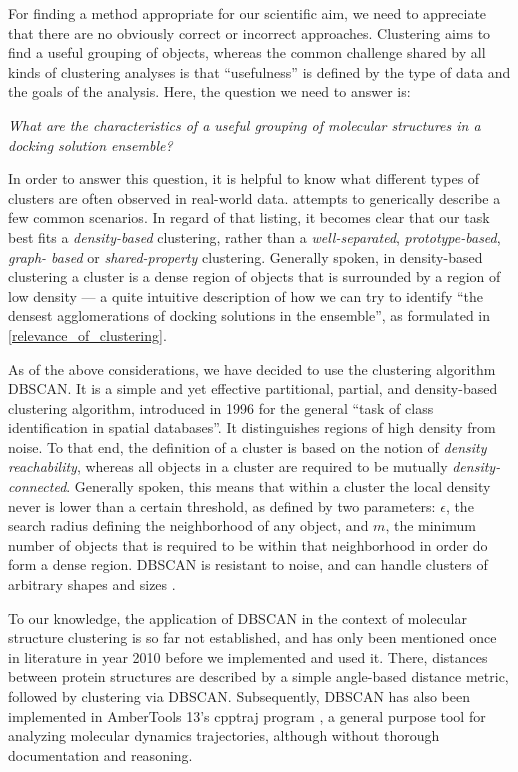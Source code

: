 For finding a method appropriate for our scientific aim, we need to appreciate
that there are no obviously correct or incorrect approaches. Clustering aims to
find a useful grouping of objects, whereas the common challenge shared by all
kinds of clustering analyses is that \enquote{usefulness} is defined by the type
of data and the goals of the analysis. Here, the question we need to answer is:

\begin{adjustwidth}{1.5cm}{1.5cm}
\textit{What are the characteristics of a useful grouping of
molecular structures in a docking solution ensemble?}
\end{adjustwidth}

In order to answer this question, it is helpful to know what different types of
clusters are often observed in real-world data. \cite{tan_data_mining} attempts
to generically describe a few common scenarios. In regard of that listing, it
becomes clear that our task best fits a \textit{density-based} clustering,
rather than a \textit{well-separated}, \textit{prototype-based}, \textit{graph-
based} or \textit{shared-property} clustering. Generally spoken, in
density-based clustering a cluster is a dense region of objects that is
surrounded by a region of low density --- a quite intuitive description of how
we can try to identify \enquote{the densest agglomerations of docking solutions
in the ensemble}, as formulated in \cref{relevance_of_clustering}.

As of the above considerations, we have decided to use the clustering algorithm
DBSCAN. It is a simple and yet effective partitional, partial, and density-based
clustering algorithm, introduced in 1996 \cite{dbscan_ester1996} for the general
\enquote{task of class identification in spatial databases}. It distinguishes
regions of high density from noise. To that end, the definition of a cluster is
based on the notion of \textit{density reachability}, whereas all objects in a
cluster are required to be mutually \textit{density-connected}. Generally
spoken, this means that within a cluster the local density never is  lower than
a certain threshold, as defined by two parameters: $\epsilon$, the search radius
defining the neighborhood of any object, and $m$, the minimum number of objects
that is required to be within that neighborhood in order do form a dense region.
DBSCAN is resistant to noise, and can handle clusters of arbitrary shapes and
sizes \cite{dbscan_ester1996}.

To our knowledge, the application of DBSCAN in the context of molecular
structure clustering is so far not established, and has only been mentioned once
in literature in year 2010 \cite{dbscan_usage_proteinstructures_2010} before we
implemented and used it. There, distances between protein structures are
described by a simple angle-based distance metric, followed by clustering via
DBSCAN. Subsequently, DBSCAN has also been implemented in AmberTools 13's
cpptraj program \cite{cpptraj_2013}, a general purpose tool for analyzing
molecular dynamics trajectories, although without thorough documentation and
reasoning.

